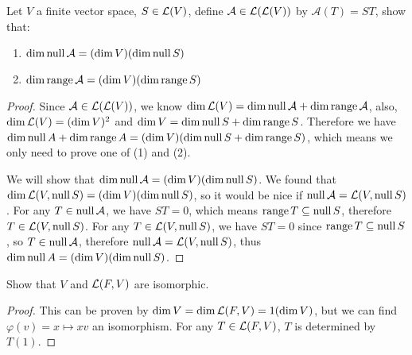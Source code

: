\documentclass[../main.tex]{subfiles}
\begin{document}
\setcounter{exercise}{16}
\begin{exercise}
  Let $V$ a finite vector space, $S \in \mathcal{L}(V)$, define $\mathcal{A} \in \mathcal{L}(\mathcal{L}(V))$
  by $\mathcal{A}(T) = ST$, show that:
  \begin{enumerate}
    \item $\dim \operatorname{null} \mathcal{A} = (\dim V) (\dim \operatorname{null} S)$
    \item $\dim \operatorname{range} \mathcal{A} = (\dim V) (\dim \operatorname{range} S)$
  \end{enumerate}
\end{exercise}
\begin{proof}
  Since $\mathcal{A} \in \mathcal{L}(\mathcal{L}(V))$, we know $\dim \mathcal{L}(V) = \dim \operatorname{null} \mathcal{A} + \dim \operatorname{range} \mathcal{A}$,
  also, $\dim \mathcal{L}(V) = (\dim V)^2$ and $\dim V = \dim \operatorname{null} S + \dim \operatorname{range} S$.
  Therefore we have $\dim \operatorname{null} A + \dim \operatorname{range} A = (\dim V)(\dim \operatorname{null} S + \dim \operatorname{range} S)$,
  which means we only need to prove one of (1) and (2).

  We will show that $\dim \operatorname{null} \mathcal{A} = (\dim V)(\dim \operatorname{null} S)$.
  We found that \\
  $\dim \mathcal{L}(V, \operatorname{null} S) = (\dim V)(\dim \operatorname{null} S)$, so it would be nice
  if $\operatorname{null} \mathcal{A} = \mathcal{L}(V, \operatorname{null} S)$.
  For any $T \in \operatorname{null} \mathcal{A}$, we have $ST = 0$, which means $\operatorname{range} T \subseteq \operatorname{null} S$,
  therefore $T \in \mathcal{L}(V, \operatorname{null} S)$. For any $T \in \mathcal{L}(V, \operatorname{null} S)$,
  we have $ST = 0$ since $\operatorname{range} T \subseteq \operatorname{null} S$, so $T \in \operatorname{null} \mathcal{A}$,
  therefore $\operatorname{null} \mathcal{A} = \mathcal{L}(V, \operatorname{null} S)$, thus $\dim \operatorname{null} A = (\dim V)(\dim \operatorname{null} S)$.
\end{proof}

\begin{exercise}
  Show that $V$ and $\mathcal{L}(F, V)$ are isomorphic.
\end{exercise}
\begin{proof}
  This can be proven by $\dim V = \dim \mathcal{L}(F, V) = 1 (\dim V)$,
  but we can find $\varphi(v) = x \mapsto xv$ an isomorphism.
  For any $T \in \mathcal{L}(F, V)$, $T$ is determined by $T(1)$.
\end{proof}
\end{document}
